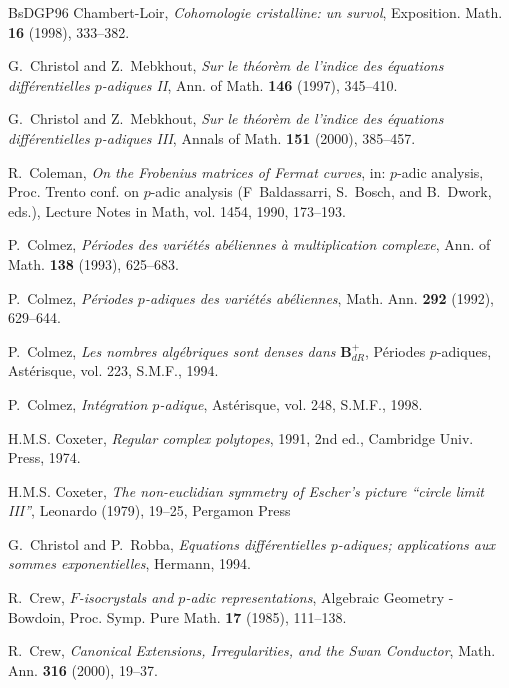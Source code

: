 \begin{thebibliography}{BsDGP96}
Chambert-Loir, \emph{Cohomologie cristalline: un survol}, Exposition. Math.
  \textbf{16} (1998), 333--382.

G.~Christol and Z.~Mebkhout, \emph{Sur le th\'eor\`em de l'indice des
  \'equations diff\'erentielles $p$-adiques {I}{I}}, Ann. of Math. \textbf{146}
  (1997), 345--410.

G.~Christol and Z.~Mebkhout, \emph{Sur le th\'eor\`em de l'indice des
  \'equations diff\'erentielles $p$-adiques {I}{I}{I}}, Annals of Math.
  \textbf{151} (2000), 385--457.

R.~Coleman, \emph{On the {F}robenius matrices of {F}ermat curves}, in: $p$-adic
  analysis, Proc. Trento conf. on $p$-adic analysis (F~Baldassarri, S.~Bosch,
  and B.~Dwork, eds.), Lecture Notes in Math, vol. 1454, 1990, 173--193.

P.~Colmez, \emph{P\'eriodes des vari\'et\'es ab\'eliennes \`a multiplication complexe}, Ann. of Math. \textbf{138}
  (1993), 625--683.

P.~Colmez, \emph{P\'eriodes $p$-adiques des vari\'et\'es ab\'eliennes}, Math.
  Ann. \textbf{292} (1992), 629--644.

P.~Colmez, \emph{Les nombres alg\'ebriques sont denses dans} 
  $\mathbf{B}^+_{d{R}}$, P\'eriodes $p$-adiques, Ast\'erisque, vol. 223,
  S.M.F., 1994.

P.~Colmez, \emph{Int\'egration $p$-adique}, Ast\'erisque, vol. 248, S.M.F.,
  1998.

H.M.S. Coxeter, \emph{Regular complex polytopes}, 1991, 2nd ed., Cambridge
  Univ. Press, 1974.

H.M.S. Coxeter, \emph{The non-euclidian symmetry of Escher's picture ``circle
  limit {I}{I}{I}''}, Leonardo (1979), 19--25, Pergamon Press

G.~Christol and P.~Robba, \emph{Equations diff\'erentielles $p$-adiques;
  applications aux sommes exponentielles}, Hermann, 1994.

R.~Crew, \emph{${F}$-isocrystals and $p$-adic representations}, Algebraic
  Geometry - Bowdoin, Proc. Symp. Pure Math. \textbf{17} (1985), 111--138.

R.~Crew, \emph{Canonical Extensions, Irregularities, and the Swan
  Conductor}, Math. Ann. \textbf{316} (2000), 19--37.


\end{thebibliography}
